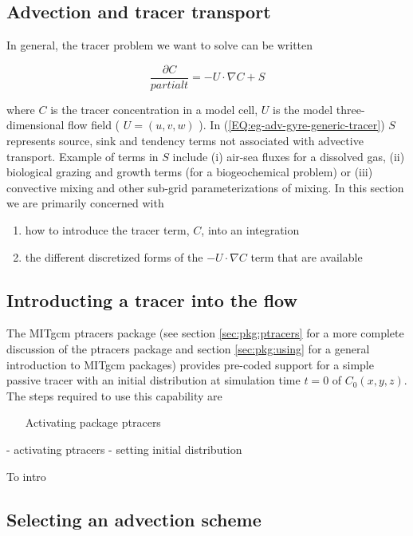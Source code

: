\subsection{Advection and tracer transport}

In general, the tracer problem we want to solve can be written

\begin{equation}
\label{EQ:eg-adv-gyre-generic-tracer}
\frac{\partial C}{partial t} = -U \cdot \nabla C + S
\end{equation}

where $C$ is the tracer concentration in a model cell, $U$ is the model three-dimensional
flow field ( $U=(u,v,w)$ ). In (\ref{EQ:eg-adv-gyre-generic-tracer}) $S$ represents source, sink 
and tendency terms not associated with advective transport. Example of terms in $S$ include
(i) air-sea fluxes for a dissolved gas, (ii) biological grazing and growth terms (for a 
biogeochemical problem) or (iii) convective mixing and other sub-grid parameterizations of 
mixing. In this section we are primarily concerned with 
\begin{enumerate}
\item how to introduce the tracer term, $C$, into an integration
\item the different discretized forms of 
the $-U \cdot \nabla C$ term that are available
\end{enumerate}


\subsection{Introducting a tracer into the flow}

 The MITgcm ptracers package (see section \ref{sec:pkg:ptracers} for a more complete discussion
of the ptracers package and section \ref{sec:pkg:using} for a general introduction to MITgcm 
packages) provides pre-coded support for a simple passive tracer with an initial
distribution at simulation time $t=0$ of $C_0(x,y,z)$. The steps required to use this capability
are 
\begin{enumerate}
\item[Activating package ptracers] 
\end{enumerate}

- activating ptracers
- setting initial distribution

To intro
\subsection{Selecting an advection scheme}

